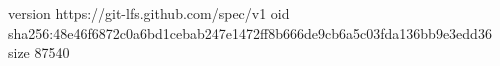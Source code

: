 version https://git-lfs.github.com/spec/v1
oid sha256:48e46f6872c0a6bd1cebab247e1472ff8b666de9cb6a5c03fda136bb9e3edd36
size 87540
